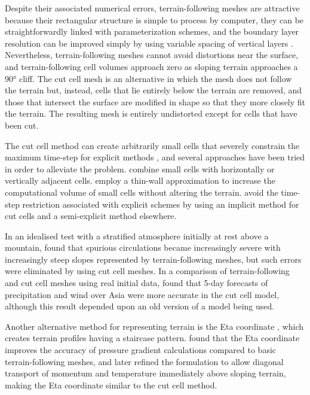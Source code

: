 Despite their associated numerical errors, terrain-following meshes are attractive because their rectangular structure is simple to process by computer, they can be straightforwardly linked with parameterization schemes, and the boundary layer resolution can be improved simply by using variable spacing of vertical layers \citep{schaer2002}.
Nevertheless, terrain-following meshes cannot avoid distortions near the surface, and terrain-following cell volumes approach zero as sloping terrain approaches a \ang{90} cliff.
The cut cell mesh is an alternative in which the mesh does not follow the terrain but, instead, cells that lie entirely below the terrain are removed, and those that intersect the surface are modified in shape so that they more closely fit the terrain.
The resulting mesh is entirely undistorted except for cells that have been cut.

The cut cell method can create arbitrarily small cells that severely constrain the maximum time-step for explicit methods \citep{klein2009}, and several approaches have been tried in order to alleviate the problem.
\citet{yamazaki-satomura2010} combine small cells with horizontally or vertically adjacent cells.
\citet{steppeler2002} employ a thin-wall approximation to increase the computational volume of small cells without altering the terrain.
\citet{jebens2011} avoid the time-step restriction associated with explicit schemes by using an implicit method for cut cells and a semi-explicit method elsewhere.

In an idealised test with a stratified atmosphere initially at rest above a mountain, \citet{good2014} found that spurious circulations became increasingly severe with increasingly steep slopes represented by terrain-following meshes, but such errors were eliminated by using cut cell meshes.
In a comparison of terrain-following and cut cell meshes using real initial data, \citet{steppeler2013} found that 5-day forecasts of precipitation and wind over Asia were more accurate in the cut cell model, although this result depended upon an old version of a model being used.

Another alternative method for representing terrain is the Eta coordinate \citep{mesinger1988}, which creates terrain profiles having a staircase pattern.
\citet{mesinger1988} found that the Eta coordinate improves the accuracy of pressure gradient calculations compared to basic terrain-following meshes, and \citet{mesinger2012} later refined the formulation to allow diagonal transport of momentum and temperature immediately above sloping terrain, making the Eta coordinate similar to the cut cell method.

